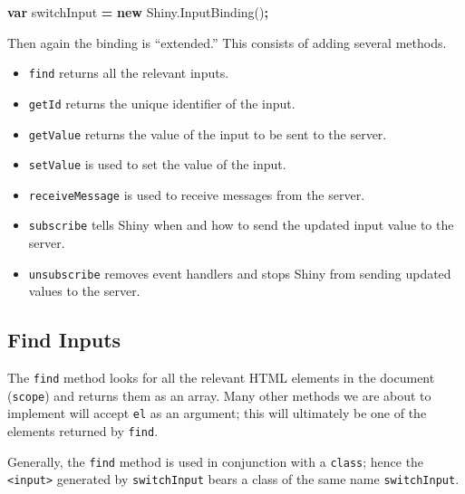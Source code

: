 \documentclass[10pt,]{krantz}
\makeatletter
\newenvironment{Shaded}{\begin{snugshade}}{\end{snugshade}}
\newcommand{\AttributeTok}[1]{\textcolor[rgb]{0.61,0.61,0.61}{#1}}
\newcommand{\CommentTok}[1]{\textcolor[rgb]{0.37,0.37,0.37}{\textit{#1}}}
\newcommand{\ControlFlowTok}[1]{\textcolor[rgb]{0.27,0.27,0.27}{\textbf{#1}}}
\newcommand{\DataTypeTok}[1]{\textcolor[rgb]{0.27,0.27,0.27}{#1}}
\newcommand{\KeywordTok}[1]{\textcolor[rgb]{0.27,0.27,0.27}{\textbf{#1}}}
\newcommand{\NormalTok}[1]{#1}
\newcommand{\OperatorTok}[1]{\textcolor[rgb]{0.43,0.43,0.43}{\textbf{#1}}}
\newcommand{\StringTok}[1]{\textcolor[rgb]{0.5,0.5,0.5}{#1}}
\newcommand{\VariableTok}[1]{\textcolor[rgb]{0,0,0}{#1}}
\providecommand{\tightlist}{%
  \setlength{\itemsep}{0pt}\setlength{\parskip}{0pt}}
\newenvironment{kframe}{%
\medskip{}
\setlength{\fboxsep}{.8em}
 \def\at@end@of@kframe{}%
 \ifinner\ifhmode%
  \def\at@end@of@kframe{\end{minipage}}%
  \begin{minipage}{\columnwidth}%
 \fi\fi%
 \def\FrameCommand##1{\hskip\@totalleftmargin \hskip-\fboxsep
 \colorbox{shadecolor}{##1}\hskip-\fboxsep
     \hskip-\linewidth \hskip-\@totalleftmargin \hskip\columnwidth}%
 \MakeFramed {\advance\hsize-\width
   \@totalleftmargin\z@ \linewidth\hsize
   \@setminipage}}%
 {\par\unskip\endMakeFramed%
 \at@end@of@kframe}
\renewenvironment{Shaded}{\begin{kframe}}{\end{kframe}}
\makeatother
\begin{document}
\begin{Shaded}
\begin{Highlighting}[]
\KeywordTok{var}\NormalTok{ switchInput }\OperatorTok{=} \KeywordTok{new} \VariableTok{Shiny}\NormalTok{.}\AttributeTok{InputBinding}\NormalTok{()}\OperatorTok{;}
\end{Highlighting}
\end{Shaded}

Then again the binding is ``extended.'' This consists of adding several methods.

\begin{itemize}
\tightlist
\item
  \texttt{find} returns all the relevant inputs.
\item
  \texttt{getId} returns the unique identifier of the input.
\item
  \texttt{getValue} returns the value of the input to be sent to the server.
\item
  \texttt{setValue} is used to set the value of the input.
\item
  \texttt{receiveMessage} is used to receive messages from the server.
\item
  \texttt{subscribe} tells Shiny when and how to send the updated input value to the server.
\item
  \texttt{unsubscribe} removes event handlers and stops Shiny from sending updated values to the server.
\end{itemize}

\hypertarget{shiny-input-find}{%
\subsection{Find Inputs}\label{shiny-input-find}}

The \texttt{find} method looks for all the relevant HTML elements in the document (\texttt{scope}) and returns them as an array. Many other methods we are about to implement will accept \texttt{el} as an argument; this will ultimately be one of the elements returned by \texttt{find}.

Generally, the \texttt{find} method is used in conjunction with a \texttt{class}; hence the \texttt{\textless{}input\textgreater{}} generated by \texttt{switchInput} bears a class of the same name \texttt{switchInput}.

\begin{Shaded}
\end{Shaded}
\end{document}
